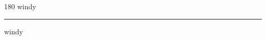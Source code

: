 
\begin{frame}
\begin{center}
\begin{turn}{180}
{\fontsize{2.5cm}{1em}\selectfont windy}
\end{turn}
\vspace{1em}\par  
\hrule
\vspace{1em}\par  
{\fontsize{2.5cm}{1em}\selectfont windy}
\end{center}
\end{frame}
